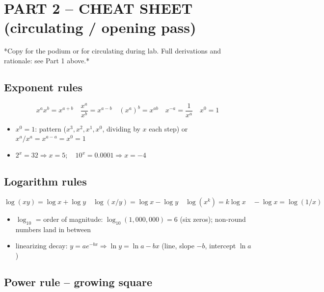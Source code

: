 \documentclass[12pt,]{article}
\providecommand{\tightlist}{%
  \setlength{\itemsep}{0pt}\setlength{\parskip}{0pt}}
\begin{document}
\newpage

\large

\section{PART 2 -- CHEAT SHEET (circulating / opening
pass)}\label{part-2-cheat-sheet-circulating-opening-pass}

\normalsize
*Copy for the podium or for circulating during lab. Full derivations and
rationale: see Part 1 above.* \large

\subsection{Exponent rules}\label{exponent-rules-1}

\[x^a x^b = x^{a+b} \quad \frac{x^a}{x^b}=x^{a-b} \quad (x^a)^b=x^{ab} \quad x^{-a}=\frac1{x^a} \quad x^0=1\]

\begin{itemize}
\tightlist
\item
  \(x^0=1\): pattern (\(x^3,x^2,x^1,x^0\), dividing by \(x\) each step)
  or \(x^a/x^a=x^{a-a}=x^0=1\)
\item
  \(2^x=32\Rightarrow x=5\); ~ \(10^x=0.0001\Rightarrow x=-4\)
\end{itemize}

\subsection{Logarithm rules}\label{logarithm-rules-1}

\[\log(xy)=\log x+\log y \quad \log(x/y)=\log x-\log y \quad \log(x^k)=k\log x \quad -\log x=\log(1/x)\]

\begin{itemize}
\tightlist
\item
  \(\log_{10}\) = order of magnitude: \(\log_{10}(1{,}000{,}000)=6\)
  (six zeros); non-round numbers land in between
\item
  linearizing decay: \(y=ae^{-bx} \Rightarrow \ln y = \ln a - bx\)
  (line, slope \(-b\), intercept \(\ln a\))
\end{itemize}

\newpage

\subsection{Power rule -- growing
square}\label{power-rule-growing-square}
\end{document}
